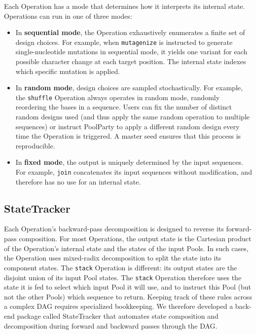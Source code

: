 \documentclass[unnumsec,webpdf,modern,large]{mam-authoring-template}%
\theoremstyle{thmstyleone}%
\theoremstyle{thmstyletwo}%
\theoremstyle{thmstylethree}%
\begin{document}
Each Operation has a mode that determines how it interprets its internal state. Operations can run in one of three modes:

\begin{itemize}
\item In \textbf{sequential mode}, the Operation exhaustively enumerates a finite set of design choices. For example, when \texttt{mutagenize} is instructed to generate single-nucleotide mutations in sequential mode, it yields one variant for each possible character change at each target position. The internal state indexes which specific mutation is applied.

\item In \textbf{random mode}, design choices are sampled stochastically. For example, the \texttt{shuffle} Operation always operates in random mode, randomly reordering the bases in a sequence. Users can fix the number of distinct random designs used (and thus apply the same random operation to multiple sequences) or instruct PoolParty to apply a different random design every time the Operation is triggered. A master seed ensures that this process is reproducible. 

\item In \textbf{fixed mode}, the output is uniquely determined by the input sequences. For example, \texttt{join} concatenates its input sequences without modification, and therefore has no use for an internal state. 
\end{itemize}

\subsection{StateTracker}

Each Operation's backward-pass decomposition is designed to reverse its forward-pass composition. For most Operations, the output state is the Cartesian product of the Operation's internal state and the states of the input Pools. In such cases, the Operation uses mixed-radix decomposition to split the state into its component states. The \texttt{stack} Operation is different: its output states are the disjoint union of its input Pool states. The \texttt{stack} Operation therefore uses the state it is fed to select which input Pool it will use, and to instruct this Pool (but not the other Pools) which sequence to return. Keeping track of these rules across a complex DAG requires specialized bookkeeping. We therefore developed a back-end package called StateTracker that automates state composition and decomposition during forward and backward passes through the DAG.
\end{document}
